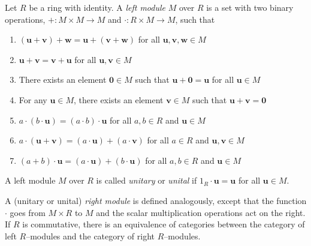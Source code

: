\documentclass{article}
\renewcommand{\u}{\mathbf{u}}
\renewcommand{\v}{\mathbf{v}}
\newcommand{\w}{\mathbf{w}}
\newcommand{\0}{\mathbf{0}}
\begin{document}
Let $R$ be a ring with identity. A {\em left module} $M$ over $R$ is a set with two binary operations, $+: M\times M \longrightarrow M$ and $\cdot: R \times M \longrightarrow M$, such that
\begin{enumerate}
\item $(\u+\v)+\w = \u+(\v+\w)$ for all $\u,\v,\w \in M$
\item $\u+\v=\v+\u$ for all $\u,\v\in M$
\item There exists an element $\0 \in M$ such that $\u+\0=\u$ for all $\u \in M$
\item For any $\u \in M$, there exists an element $\v \in M$ such that $\u+\v=\0$
\item $a \cdot (b \cdot \u) = (a \cdot b) \cdot \u$ for all $a,b \in R$ and $\u \in M$
\item $a \cdot (\u+\v) = (a \cdot \u) + (a \cdot \v)$ for all $a \in R$ and $\u,\v \in M$
\item $(a + b) \cdot \u = (a \cdot \u) + (b \cdot \u)$ for all $a,b \in R$ and $\u \in M$
\end{enumerate}

A left module $M$ over $R$ is called \emph{unitary} or \emph{unital} if $1_R \cdot \u = \u$ for all $\u \in M$.

A (unitary or unital) \emph{right module} is defined analogously, except that the function $\cdot$ goes from $M \times R$ to $M$ and the scalar multiplication operations act on the right. If $R$ is commutative, there is an equivalence of categories between the category of left $R$--modules and the category of right $R$--modules.
\end{document}
